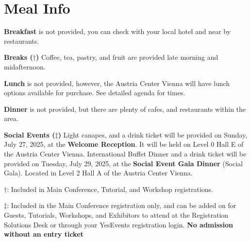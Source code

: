 \chapter{Meal Info}
\vspace*{0.2cm}

\textbf{Breakfast} is not provided, you can check with your local hotel and near by restaurants.

\textbf{Breaks ($\dagger$)} Coffee, tea, pastry, and fruit are provided late morning and midafternoon.

\textbf{Lunch} is not provided, however, the Austria Center Vienna will have lunch options available for purchase. See detailed agenda for times. 

\textbf{Dinner} is  not provided, but there are plenty of cafes, and restaurants within the area.

\textbf{Social Events ($\ddagger$)} 
Light canapes, and a drink ticket will be provided on Sunday, July 27, 2025, at the \textbf{Welcome Reception}. It will be held on Level 0 Hall E of the Austria Center Vienna. 
International Buffet Dinner and a drink ticket will be provided on Tuesday, July 29, 2025, at the \textbf{Social Event Gala Dinner} (Social Gala). Located in Level 2 Hall A of the Austria Center Vienna.

$\dagger$: Included in Main Conference, Tutorial, and Workshop registrations.

$\ddagger$: Included in the Main Conference registration only, and can be added on for Guests, Tutorials, Workshops, and Exhibitors to attend at the Registration Solutions Desk or through your YesEvents registration login. \textbf{No admission without an entry ticket}
